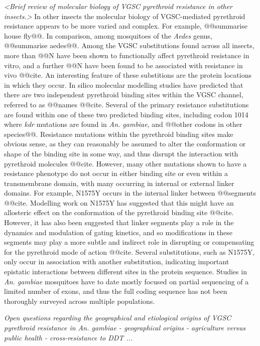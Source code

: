 \documentclass[a4paper,11pt,abstracton,hidelinks]{scrartcl}
\begin{document}
\textit{<Brief review of molecular biology of VGSC pyrethroid resistance in other insects.>}
%
In other insects the molecular biology of VGSC-mediated pyrethroid resistance appears to be more varied and complex.
%
For example, @@summarise house fly@@.
%
In comparison, among mosquitoes of the \textit{Aedes} genus, @@summarise aedes@@.
%
Among the VGSC substitutions found across all insects, more than @@N have been shown to functionally affect pyrethroid resistance in vitro, and a further @@N have been found to be associated with resistance in vivo @@cite.
%
An interesting feature of these substitions are the protein locations in which they occur.
%
In silico molecular modelling studies have predicted that there are two independent pyrethroid binding sites within the VGSC channel, referred to as @@names @@cite.
%
Several of the primary resistance substitutions are found within one of these two predicted binding sites, including codon 1014 where \textit{kdr} mutations are found in \textit{An. gambiae}, and @@other codons in other species@@.
%
Resistance mutations within the pyrethroid binding sites make obvious sense, as they can reasonably be assumed to alter the conformation or shape of the binding site in some way, and thus disrupt the interaction with pyrethroid molecules @@cite.
%
However, many other mutations shown to have a resistance phenotype do not occur in either binding site or even within a transmembrane domain, with many occurring in internal or external linker domains.
%
For example, N1575Y occurs in the internal linker between @@segments @@cite.
%
Modelling work on N1575Y has suggested that this might have an allosteric effect on the conformation of the pyrethroid binding site @@cite.
%
However, it has also been suggested that linker segments play a role in the dynamics and modulation of gating kinetics, and so modifications in these segments may play a more subtle and indirect role in disrupting or compensating for the pyrethroid mode of action @@cite.
%
Several substitutions, such as N1575Y, only occur in association with another substitution, indicating important epistatic interactions between different sites in the protein sequence.
%
Studies in \textit{An. gambiae} mosquitoes have to date mostly focused on partial sequencing of a limited number of exons, and thus the full coding sequence has not been thoroughly surveyed across multiple populations.


\textit{Open questions regarding the geographical and etiological origins of VGSC pyrethroid resistance in An. gambiae - geographical origins - agriculture versus public health - cross-resistance to DDT ... }
%
\end{document}
